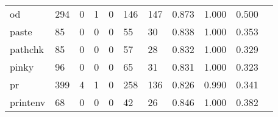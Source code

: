 \begin{longtable}{lp{1.2cm}p{1.2cm}p{1.2cm}p{1.2cm}p{1.2cm}p{1.2cm}p{1.2cm}p{1.2cm}p{1.2cm}p{1.2cm}}
od        &                                   294 &                                                  0 &                                                  1 &                                                  0 &                                                146 &                                                147 &                                              0.873 &                                              1.000 &                                              0.500 \\
paste     &                                    85 &                                                  0 &                                                  0 &                                                  0 &                                                 55 &                                                 30 &                                              0.838 &                                              1.000 &                                              0.353 \\
pathchk   &                                    85 &                                                  0 &                                                  0 &                                                  0 &                                                 57 &                                                 28 &                                              0.832 &                                              1.000 &                                              0.329 \\
pinky     &                                    96 &                                                  0 &                                                  0 &                                                  0 &                                                 65 &                                                 31 &                                              0.831 &                                              1.000 &                                              0.323 \\
pr        &                                   399 &                                                  4 &                                                  1 &                                                  0 &                                                258 &                                                136 &                                              0.826 &                                              0.990 &                                              0.341 \\
printenv  &                                    68 &                                                  0 &                                                  0 &                                                  0 &                                                 42 &                                                 26 &                                              0.846 &                                              1.000 &                                              0.382 \\

\end{longtable}
